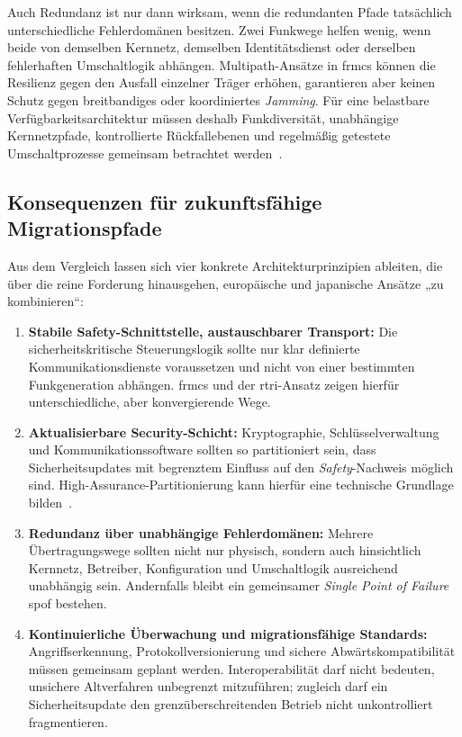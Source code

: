 \documentclass[runningheads]{res/llncs}
\begin{document}
Auch Redundanz ist nur dann wirksam, wenn die redundanten Pfade tatsächlich unterschiedliche Fehlerdomänen besitzen. Zwei Funkwege helfen wenig, wenn beide von demselben Kernnetz, demselben Identitätsdienst oder derselben fehlerhaften Umschaltlogik abhängen. Multipath-Ansätze in \gls{frmcs} können die Resilienz gegen den Ausfall einzelner Träger erhöhen, garantieren aber keinen Schutz gegen breitbandiges oder koordiniertes \textit{Jamming}. Für eine belastbare Verfügbarkeitsarchitektur müssen deshalb Funkdiversität, unabhängige Kernnetzpfade, kontrollierte Rückfallebenen und regelmäßig getestete Umschaltprozesse gemeinsam betrachtet werden~\parencite[S. 114--117]{trinckaufETCS2024}.

\subsection{Konsequenzen für zukunftsfähige Migrationspfade}
\label{sec:Zukunftsfähige_Migrationspfade_FRMCS_und_IEC_62280}
Aus dem Vergleich lassen sich vier konkrete Architekturprinzipien ableiten, die über die reine Forderung hinausgehen, europäische und japanische Ansätze „zu kombinieren“:

\begin{enumerate}
    \item \textbf{Stabile Safety-Schnittstelle, austauschbarer Transport:} Die sicherheitskritische Steuerungslogik sollte nur klar definierte Kommunikationsdienste voraussetzen und nicht von einer bestimmten Funkgeneration abhängen. \gls{frmcs} und der \gls{rtri}-Ansatz zeigen hierfür unterschiedliche, aber konvergierende Wege.
    \item \textbf{Aktualisierbare Security-Schicht:} Kryptographie, Schlüsselverwaltung und Kommunikationssoftware sollten so partitioniert sein, dass Sicherheitsupdates mit begrenztem Einfluss auf den \textit{Safety}-Nachweis möglich sind. High-Assurance-Partitionierung kann hierfür eine technische Grundlage bilden~\cite{schulzIntegration2019}.
    \item \textbf{Redundanz über unabhängige Fehlerdomänen:} Mehrere Übertragungswege sollten nicht nur physisch, sondern auch hinsichtlich Kernnetz, Betreiber, Konfiguration und Umschaltlogik ausreichend unabhängig sein. Andernfalls bleibt ein gemeinsamer \textit{Single Point of Failure} \gls{spof} bestehen.
    \item \textbf{Kontinuierliche Überwachung und migrationsfähige Standards:} Angriffserkennung, Protokollversionierung und sichere Abwärtskompatibilität müssen gemeinsam geplant werden. Interoperabilität darf nicht bedeuten, unsichere Altverfahren unbegrenzt mitzuführen; zugleich darf ein Sicherheitsupdate den grenzüberschreitenden Betrieb nicht unkontrolliert fragmentieren.
\end{enumerate}
\end{document}
